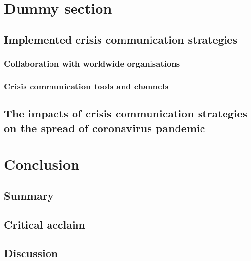 \documentclass[draft=false
              ,paper=a4
              ,twoside=false
              ,fontsize=12pt
              ,headsepline
              ,BCOR10mm
              ,DIV11
              ]{article}
\begin{document}
\vspace{12pt}
\section{Dummy section}
\vspace{6pt}
\subsection{Implemented crisis communication strategies}
\vspace{6pt}
\subsubsection{Collaboration with worldwide organisations}
\vspace{6pt}

\vspace{12pt}
\subsubsection{Crisis communication tools and channels}
\vspace{6pt}

\vspace{12pt}
\subsection{The impacts of crisis communication strategies on the spread of coronavirus pandemic}
\vspace{6pt}

\vspace{12pt}
\section{Conclusion}
\vspace{6pt}
\subsection{Summary}
\vspace{6pt}

\vspace{12pt}
\subsection{Critical acclaim}
\vspace{6pt}

\vspace{12pt}
\subsection{Discussion}
\vspace{6pt}

\printbibliography[title={V. List of references}]
\printglossary[type=\acronymtype,title={VI. List of Abbreviations}]
\newpage

\end{document}
